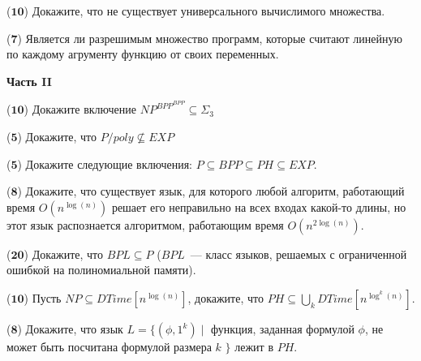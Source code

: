 \begin{task}($\mathbf{10}$)
    Докажите, что не существует универсального вычислимого множества.
\end{task}

\begin{task}($\mathbf{7}$)
    Является ли разрешимым множество программ, которые считают линейную по каждому агрументу функцию от своих переменных.
\end{task}




\begin{center}
    \textbf{Часть II}
\end{center}


\begin{task}($\mathbf{10}$)
    Докажите включение $NP^{BPP^{BPP}} \subseteq \Sigma_3$
\end{task}

\begin{task}($\mathbf{5}$)
    Докажите, что $P/poly \nsubseteq EXP$
\end{task}

\begin{task}($\mathbf{5}$)
    Докажите следующие включения: $P \subseteq BPP \subseteq PH \subseteq EXP$.
\end{task}

\begin{task}($\mathbf{8}$)
    Докажите, что существует язык, для которого любой алгоритм, работающий время
    $O(n^{\log(n)})$ решает его неправильно на всех входах какой-то длины, но
    этот язык распознается алгоритмом, работающим время $O(n^{2 \log(n)})$.
\end{task}

\begin{task}($\mathbf{20}$)
    Докажите, что $BPL \subseteq P$ ($BPL$~--- класс языков, решаемых с ограниченной
    ошибкой на полиномиальной памяти).
\end{task}

\begin{task}($\mathbf{10}$)
    Пусть $NP \subseteq DTime[n^{\log(n)}]$, докажите, что $PH \subseteq \bigcup\limits_{k}DTime[n^{\log^k(n)}]$.
\end{task}

\begin{task}($\mathbf{8}$)
    Докажите, что язык $L = \{(\phi, 1^k) \mid$ функция, заданная формулой $\phi$, не может быть посчитана формулой размера $k$
    $\}$ лежит в $PH$.
\end{task}